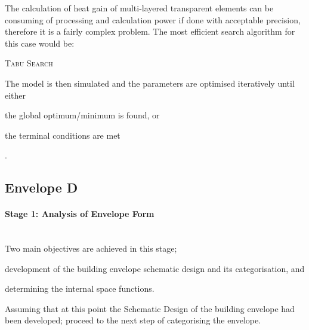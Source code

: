 The calculation of heat gain of multi-layered transparent elements can be consuming of processing and calculation power if done with acceptable precision, therefore it is a fairly complex problem. The most efficient search algorithm for this case would be:

\begin{compactenum}
\item \textsc{Tabu Search}
\end{compactenum}

The model is then simulated and the parameters are optimised iteratively until either \begin{inparaenum}[a)]\item the global optimum/minimum is found, or \item the terminal conditions are met\end{inparaenum}.


\clearpage
\subsection{Envelope D}

\paragraph{Stage 1: Analysis of Envelope Form}\mbox{}\\[2mm]

Two main objectives are achieved in this stage; \begin{inparaenum}[a)] \item development of the building envelope schematic design and its categorisation, and \item determining the internal space functions.\end{inparaenum}

Assuming that at this point the Schematic Design of the building envelope had been developed; proceed to the next step of categorising the envelope.

